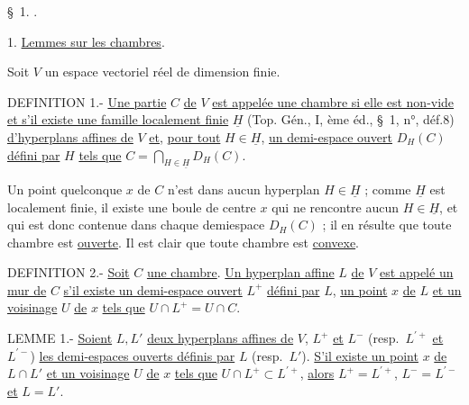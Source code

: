 

\hfill {}

\S~1. .

1. \uline{Lemmes sur les chambres}.

Soit $V$ un espace vectoriel réel de dimension finie.

DEFINITION 1.- \uline{Une partie} $C$ \uline{de} $V$ \uline{est appelée une chambre si elle est non-vide et s'il existe une famille localement finie} $\underline H$ (Top. Gén., I, ème éd., \S~1, n°, déf.8) \uline{d'hyperplans affines de} $V$ \uline{et}, \uline{pour tout} $H\in\underline H$, \uline{un demi-espace ouvert} $D_H(C)$ \uline{défini par} $H$ \uline{tels que} $C=\displaystyle\bigcap_{H\in\underline H}D_H(C)$.

Un point quelconque $x$ de $C$ n'est dans aucun hyperplan $H\in\underline H$ ; comme $\underline H$ est localement finie, il existe une boule de centre $x$ qui ne rencontre aucun $H\in\underline H$, et qui est donc contenue dans chaque demiespace $D_H(C)$ ; il en résulte que toute chambre est \uline{ouverte}. Il est clair que toute chambre est \uline{convexe}.

DEFINITION 2.- \uline{Soit} $C$ \uline{une chambre}. \uline{Un hyperplan affine} $L$ \uline{de} $V$ \uline{est appelé un mur de} $C$ \uline{s'il existe un demi-espace ouvert} $L^+$ \uline{défini par} $L$, \uline{un point} $x$ \uline{de} $L$ \uline{et un voisinage} $U$ \uline{de} $x$ \uline{tels que} $U\cap L^+=U\cap C$.

LEMME 1.- \uline{Soient} $L,L'$ \uline{deux hyperplans affines de} $V$, $L^+$ \uline{et} $L^-$ (resp.\ $L^{\prime+}$ \uline{et} $L^{\prime-}$) \uline{les demi-espaces ouverts définis par} $L$ (resp.\ $L'$). \uline{S'il existe un point} $x$ \uline{de} $L\cap L'$ \uline{et un voisinage} $U$ \uline{de} $x$ \uline{tels que} $U\cap L^+\subset L^{\prime+}$, \uline{alors} $L^+=L^{\prime+}$, $L^-=L^{\prime-}$ \uline{et} $L=L'$.

